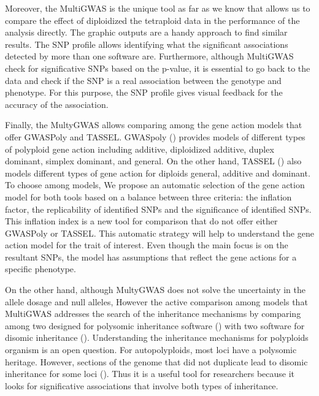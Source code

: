 \documentclass{article}
\begin{document}
Moreover, the MultiGWAS is the unique tool as far as we know that allows us to compare the effect of diploidized the tetraploid data in the performance of the analysis directly. The graphic outputs are a handy approach to find similar results. The SNP profile allows identifying what the significant associations detected by more than one software are. Furthermore, although MultiGWAS check for significative SNPs based on the p-value, it is essential to go back to the data and check if the SNP is a real association between the genotype and phenotype. For this purpose, the SNP profile gives visual feedback for the accuracy of the association.


Finally, the MultyGWAS allows comparing among the gene action models that offer GWASPoly and TASSEL.  GWASpoly (\cite{Rosyara2016}) provides models of different types of polyploid gene action including additive, diploidized additive, duplex dominant, simplex dominant, and general. On the other hand, TASSEL (\cite{Bradbury2007}) also models different types of gene action for diploids general, additive and dominant. To choose among models, We propose an automatic selection of the gene action model for both tools based on a balance between three criteria: the inflation factor, the replicability of identified SNPs and the significance of identified SNPs. This inflation index is a new tool for comparison that do not offer either GWASPoly or TASSEL. This automatic strategy will help to understand the gene action model for the trait of interest. Even though the main focus is on the resultant SNPs, the model has assumptions that reflect the gene actions for a specific phenotype.

On the other hand, although MultyGWAS does not solve the uncertainty in the allele dosage and null alleles, However the active comparison among models that MultiGWAS addresses the search of the inheritance mechanisms by comparing among two designed for polysomic inheritance software (\cite{Rosyara2016, Shen2016}) with two software for disomic inheritance (\cite{Purcell2007, Bradbury2007}). Understanding the inheritance mechanisms for polyploids organism is an open question. For autopolyploids, most loci have a polysomic heritage. However, sections of the genome that did not duplicate lead to disomic inheritance for some loci (\cite{ohno1970, lynch2000,dufresne2014}). Thus it is a useful tool for researchers because it looks for significative associations that involve both types of inheritance.
\end{document}
